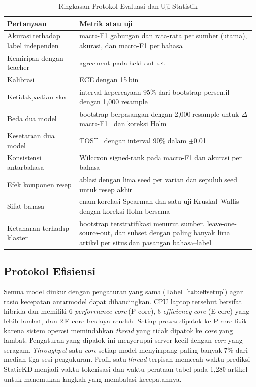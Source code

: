 \documentclass{ieeeaccess}
\newcommand{\en}[1]{\textit{#1}}
\begin{document}
\begin{table}[!t]
\caption{Ringkasan Protokol Evaluasi dan Uji Statistik}
\label{tab:protocol}
\centering
\footnotesize
\setlength{\tabcolsep}{3pt}
\begin{tabular}{@{}p{}p{}@{}}
\toprule
Pertanyaan & Metrik atau uji \\
\midrule
Akurasi terhadap label independen & macro-F1 gabungan dan rata-rata per sumber (utama), akurasi, dan macro-F1 per bahasa \\
Kemiripan dengan teacher & agreement pada held-out set \\
Kalibrasi & ECE dengan 15 bin \\
Ketidakpastian skor & interval kepercayaan 95\% dari bootstrap persentil dengan 1,000 resample \\
Beda dua model & bootstrap berpasangan dengan 2,000 resample untuk $\Delta$macro-F1~\cite{koehn2004significance} dan koreksi Holm~\cite{holm1979} \\
Kesetaraan dua model & TOST~\cite{schuirmann1987tost} dengan interval 90\% dalam $\pm$0.01 \\
Konsistensi antarbahasa & Wilcoxon signed-rank pada macro-F1 dan akurasi per bahasa~\cite{dror2018hitchhiker} \\
Efek komponen resep & ablasi dengan lima seed per varian dan sepuluh seed untuk resep akhir \\
Sifat bahasa & enam korelasi Spearman dan satu uji Kruskal--Wallis dengan koreksi Holm bersama \\
Ketahanan terhadap klaster & bootstrap terstratifikasi menurut sumber, leave-one-source-out, dan subset dengan paling banyak lima artikel per situs dan pasangan bahasa--label \\
\bottomrule
\end{tabular}
\end{table}

\subsection{Protokol Efisiensi}
\label{sec:effprotocol}
Semua model diukur dengan pengaturan yang sama (Tabel~\ref{tab:effsetup}) agar rasio kecepatan antarmodel dapat dibandingkan. CPU laptop tersebut bersifat hibrida dan memiliki 6 \en{performance core} (P-core), 8 \en{efficiency core} (E-core) yang lebih lambat, dan 2 E-core berdaya rendah. Setiap proses dipatok ke P-core fisik karena sistem operasi memindahkan \en{thread} yang tidak dipatok ke \en{core} yang lambat. Pengaturan yang dipatok ini menyerupai server kecil dengan \en{core} yang seragam. \en{Throughput} satu \en{core} setiap model menyimpang paling banyak 7\% dari median tiga sesi pengukuran. Profil satu \en{thread} terpisah memecah waktu prediksi StaticKD menjadi waktu tokenisasi dan waktu perataan tabel pada 1,280 artikel untuk menemukan langkah yang membatasi kecepatannya.
\end{document}
